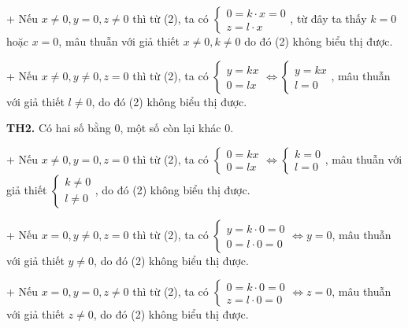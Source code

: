 \documentclass[12pt]{report}
\begin{document}
\vspace{0.2cm}
\noindent + Nếu $x \neq 0, y = 0, z \neq 0$ thì từ (2), ta có $\begin{cases} 0 = k \cdot x = 0 \\ z = l \cdot x \end{cases}$, từ đây ta thấy $k = 0$ hoặc $x = 0$, mâu thuẫn với giả thiết $x \neq 0, k \neq 0$ do đó (2) không biểu thị được.

\vspace{0.2cm}
\noindent + Nếu $x \neq 0, y \neq 0, z = 0$ thì từ (2), ta có $\begin{cases} y = kx \\ 0 = lx \end{cases} \Leftrightarrow \begin{cases} y = kx \\ l = 0 \end{cases}$, mâu thuẫn với giả thiết $l \neq 0$, do đó (2) không biểu thị được.

\vspace{0.3cm}
\noindent \textbf{TH2.} Có hai số bằng 0, một số còn lại khác 0.

\vspace{0.2cm}
\noindent + Nếu $x \neq 0, y = 0, z = 0$ thì từ (2), ta có $\begin{cases} 0 = kx \\ 0 = lx \end{cases} \Leftrightarrow \begin{cases} k = 0 \\ l = 0 \end{cases}$, mâu thuẫn với giả thiết $\begin{cases} k \neq 0 \\ l \neq 0 \end{cases}$, do đó (2) không biểu thị được.

\vspace{0.2cm}
\noindent + Nếu $x = 0, y \neq 0, z = 0$ thì từ (2), ta có $\begin{cases} y = k \cdot 0 = 0 \\ 0 = l \cdot 0 = 0 \end{cases} \Leftrightarrow y = 0$, mâu thuẫn với giả thiết $y \neq 0$, do đó (2) không biểu thị được.

\noindent 
+ Nếu $x = 0, y = 0, z \neq 0$ thì từ (2), ta có $\begin{cases} 0 = k \cdot 0 = 0 \\ z = l \cdot 0 = 0 \end{cases} \Leftrightarrow z = 0$, mâu thuẫn với giả thiết $z \neq 0$, do đó (2) không biểu thị được.
\end{document}
